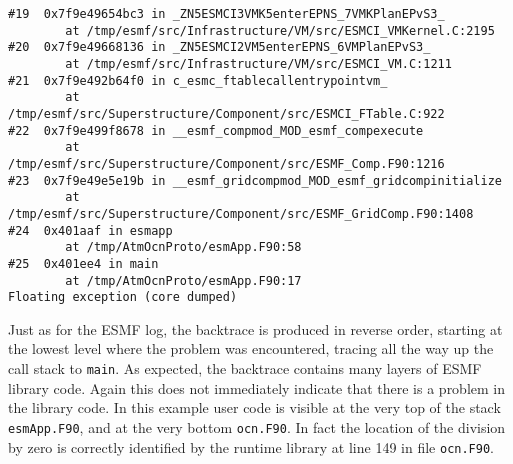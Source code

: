 \begin{verbatim}
#19  0x7f9e49654bc3 in _ZN5ESMCI3VMK5enterEPNS_7VMKPlanEPvS3_
        at /tmp/esmf/src/Infrastructure/VM/src/ESMCI_VMKernel.C:2195
#20  0x7f9e49668136 in _ZN5ESMCI2VM5enterEPNS_6VMPlanEPvS3_
        at /tmp/esmf/src/Infrastructure/VM/src/ESMCI_VM.C:1211
#21  0x7f9e492b64f0 in c_esmc_ftablecallentrypointvm_
        at /tmp/esmf/src/Superstructure/Component/src/ESMCI_FTable.C:922
#22  0x7f9e499f8678 in __esmf_compmod_MOD_esmf_compexecute
        at /tmp/esmf/src/Superstructure/Component/src/ESMF_Comp.F90:1216
#23  0x7f9e49e5e19b in __esmf_gridcompmod_MOD_esmf_gridcompinitialize
        at /tmp/esmf/src/Superstructure/Component/src/ESMF_GridComp.F90:1408
#24  0x401aaf in esmapp
        at /tmp/AtmOcnProto/esmApp.F90:58
#25  0x401ee4 in main
        at /tmp/AtmOcnProto/esmApp.F90:17
Floating exception (core dumped)
\end{verbatim}

Just as for the ESMF log, the backtrace is produced in reverse order, starting
at the lowest level where the problem was encountered, tracing all the way up
the call stack to {\tt main}. As expected, the backtrace contains many
layers of ESMF library code. Again this does not immediately indicate that there
is a problem in the library code. In this example user code is visible at the
very top of the stack {\tt esmApp.F90}, and at the very bottom {\tt ocn.F90}.
In fact the location of the division by zero is correctly identified by the
runtime library at line 149 in file {\tt ocn.F90}.
